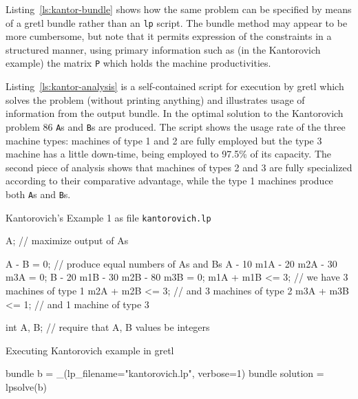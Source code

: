 \documentclass{article}
\begin{document}
Listing~\ref{ls:kantor-bundle} shows how the same problem can be
specified by means of a gretl bundle rather than an \texttt{lp}
script. The bundle method may appear to be more cumbersome, but note
that it permits expression of the constraints in a structured manner,
using primary information such as (in the Kantorovich example) the
matrix \texttt{P} which holds the machine productivities.

Listing~\ref{ls:kantor-analysis} is a self-contained script for
execution by gretl which solves the problem (without printing
anything) and illustrates usage of information from the output
bundle. In the optimal solution to the Kantorovich problem 86
\texttt{A}s and \texttt{B}s are produced. The script shows the usage
rate of the three machine types: machines of type 1 and 2 are fully
employed but the type 3 machine has a little down-time, being employed
to 97.5\% of its capacity. The second piece of analysis shows that
machines of types 2 and 3 are fully specialized according to their
comparative advantage, while the type 1 machines produce both
\texttt{A}s and \texttt{B}s.


\begin{script}[htbp]
  \caption{Kantorovich's Example 1 as file \texttt{kantorovich.lp}}
  \label{ls:kantor-lp}
\begin{scode}
A; // maximize output of As

A - B = 0; // produce equal numbers of As and Bs
A - 10 m1A - 20 m2A - 30 m3A = 0;
B - 20 m1B - 30 m2B - 80 m3B = 0;
m1A + m1B <= 3; // we have 3 machines of type 1
m2A + m2B <= 3; // and 3 machines of type 2
m3A + m3B <= 1; // and 1 machine of type 3

int A, B; // require that A, B values be integers
\end{scode}
\end{script}

\begin{script}[htbp]
  \caption{Executing Kantorovich example in gretl}
  \label{ls:kantor-inp}
\begin{scode}
bundle b = _(lp_filename="kantorovich.lp", verbose=1)
bundle solution = lpsolve(b)
\end{scode}
\end{script}
\end{document}
